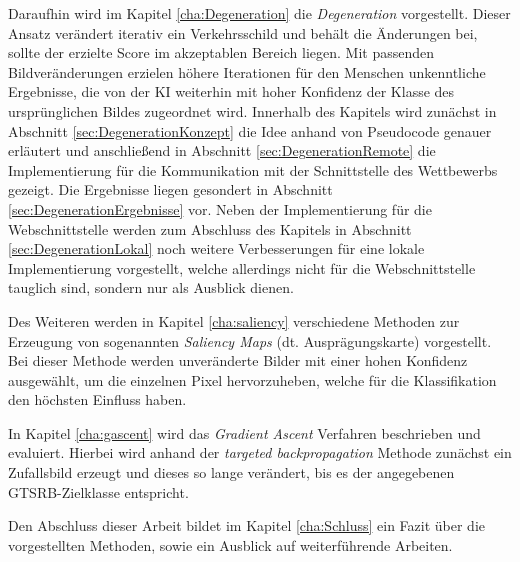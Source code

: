 Daraufhin wird im Kapitel \ref{cha:Degeneration} die \textit{Degeneration} vorgestellt. Dieser Ansatz verändert iterativ ein Verkehrsschild und behält die Änderungen bei, sollte der erzielte Score im akzeptablen Bereich liegen. 
Mit passenden Bildveränderungen erzielen höhere Iterationen für den Menschen unkenntliche Ergebnisse, die von der \ac{KI} weiterhin mit hoher Konfidenz der Klasse des ursprünglichen Bildes zugeordnet wird.
Innerhalb des Kapitels wird zunächst in Abschnitt \ref{sec:DegenerationKonzept} die Idee anhand von Pseudocode genauer erläutert und anschließend in Abschnitt \ref{sec:DegenerationRemote} die Implementierung für die Kommunikation mit der Schnittstelle des Wettbewerbs gezeigt. 
Die Ergebnisse liegen gesondert in Abschnitt \ref{sec:DegenerationErgebnisse} vor. Neben der Implementierung für die Webschnittstelle werden zum Abschluss des Kapitels in Abschnitt \ref{sec:DegenerationLokal} noch weitere Verbesserungen für eine lokale Implementierung vorgestellt, welche allerdings nicht für die Webschnittstelle tauglich sind, sondern nur als Ausblick dienen.

Des Weiteren werden in Kapitel \ref{cha:saliency} verschiedene Methoden zur Erzeugung von sogenannten \textit{Saliency Maps} (dt. Ausprägungskarte) vorgestellt. 
Bei dieser Methode werden unveränderte Bilder mit einer hohen Konfidenz ausgewählt, um die einzelnen Pixel hervorzuheben, welche für die Klassifikation den höchsten Einfluss haben.

In Kapitel \ref{cha:gascent} wird das \textit{Gradient Ascent} Verfahren beschrieben und evaluiert. 
Hierbei wird anhand der \textit{targeted backpropagation} Methode zunächst ein Zufallsbild erzeugt und dieses so lange verändert, bis es der angegebenen \ac{GTSRB}-Zielklasse entspricht.

Den Abschluss dieser Arbeit bildet im Kapitel \ref{cha:Schluss} ein Fazit über die vorgestellten Methoden, sowie ein Ausblick auf weiterführende Arbeiten. 
